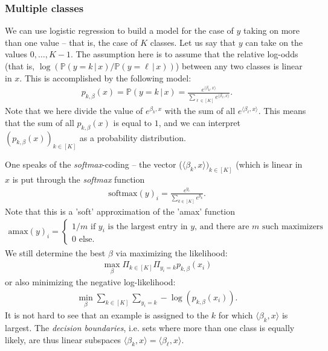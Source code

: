 \documentclass{article}
\newcommand{\sprod}[1]{\langle #1 \rangle}
\begin{document}
\subsubsection{Multiple classes} We can use logistic regression to build a model for the case of $y$ taking on more than one value -- that is, the case of $K$ classes. Let us say that $y$ can take on the values $0,\dots, K-1$. The assumption here is to assume that the relative log-odds
(that is, $\log(\mathbb{P}(y=k \, \vert \, x)/\mathbb{P}(y=\ell \, \vert \, x ))$) between any two classes is linear in $x$. This is accomplished by the following model:
\begin{align*}
    p_{k,\beta}(x) = \mathbb{P}(y=k \, \vert \, x) = \frac{e^{\sprod{\beta_k,x}}}{\sum_{\ell\in [K]}e^{\sprod{\beta_\ell,x}}}.
\end{align*}
Note that we here divide the value of $e^{\beta_k,x}$ with the sum of all $e^{\sprod{\beta_\ell,x}}$. This means that the sum of all $p_{k,\beta}(x)$ is equal to $1$, and we can interpret $(p_{k,\beta}(x))_{k\in[K]}$ as a probability distribution.

One speaks of the \emph{softmax}-coding -- the vector ($\sprod{\beta_k,x})_{k\in [K]}$ (which is linear in $x$ is put through the \emph{softmax} function
\begin{align*}
    \mathrm{softmax}(y)_i = \frac{e^{y_i}}{\sum_{k \in [K]}e^{y_k}}.
\end{align*}
Note that this is a 'soft' approximation of the 'amax' function
\begin{align*}
    \mathrm{amax}(y)_i = \begin{cases}
        1/m \text{ if } y_i \text{ is the largest entry in $y$, and there are $m$ such maximizers } \\
        0 \text{ else.}
    \end{cases}
\end{align*}
We still determine the best $\beta$ via maximizing the likelihood:
\begin{align*}
    \max_\beta \Pi_{k \in [K]} \Pi_{y_i=k} p_{k,\beta}(x_i)
\end{align*}
or also minimizing the negative log-likelihood:
\begin{align*}
    \min_\beta \sum_{k \in [K]} \sum_{y_i=k} - \log(p_{k,\beta}(x_i)).
\end{align*}
It is not hard to see that an example is assigned to the $k$ for which $\sprod{\beta_k,x}$ is largest. The \emph{decision boundaries}, i.e. sets where more than one class is equally likely, are thus linear subspaces $\sprod{\beta_k,x}=\sprod{\beta_\ell,x}$.
\end{document}
